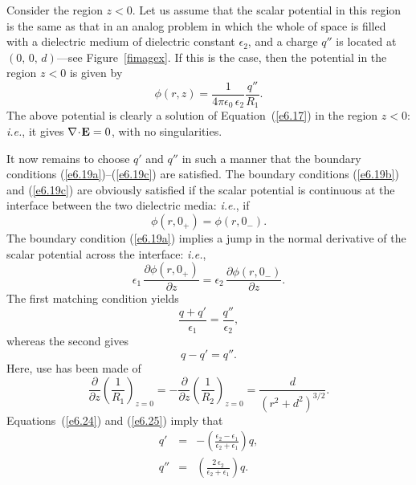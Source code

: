 Consider the region $z<0$. Let us assume that the scalar potential in this
region is the same as that in an analog problem in which the whole of space is filled
with a dielectric medium of dielectric constant $\epsilon_2$, and a charge $q''$ is located at  $(0,\,0,\,d)$---see Figure~\ref{fimagex}. If this is the case, then the potential in the region $z<0$ is
given by
\begin{equation}
\phi(r,z) = \frac{1}{4\pi\epsilon_0\,\epsilon_2} \frac{q''}{R_1}.
\end{equation}
The above potential is clearly a solution of Equation~(\ref{e6.17}) in the region
$z<0$: {\em i.e.}, it gives $\nabla\!\cdot\!{\bf E}  = 0$, with 
no singularities. 

It now remains to choose $q'$ and $q''$ in such a manner that the boundary
conditions (\ref{e6.19a})--(\ref{e6.19c}) are satisfied. The boundary conditions (\ref{e6.19b}) and
(\ref{e6.19c}) are obviously satisfied if the scalar potential is continuous
at the interface between the two dielectric media: {\em i.e.},  if
\begin{equation}
\phi(r,0_+) = \phi(r,0_-).
\end{equation}
The boundary condition (\ref{e6.19a}) implies a jump in the normal derivative
of the scalar potential across the interface: {\em i.e.}, 
\begin{equation}
\epsilon_1 \,\frac{\partial\phi(r,0_+)}{\partial z} = \epsilon_2\,
\frac{\partial \phi(r,0_-)}{\partial z}.
\end{equation}
The first matching condition yields
\begin{equation}\label{e6.24}
\frac{q+q'}{\epsilon_1} = \frac{q''}{\epsilon_2},
\end{equation}
whereas the second gives
\begin{equation}\label{e6.25}
q-q' = q''.
\end{equation}
Here, use has been made of
\begin{equation}
\frac{\partial}{\partial z}\!\left(\frac{1}{R_1}\right)_{z=0}
=- \frac{\partial}{\partial z}\!\left(\frac{1}{R_2}\right)_{z=0}
= \frac{d}{(r^2+d^2)^{3/2}}.
\end{equation}
Equations~(\ref{e6.24}) and (\ref{e6.25}) imply that
\begin{eqnarray}
q' &=& -\left(\frac{\epsilon_2-\epsilon_1}{\epsilon_2 + \epsilon_1}
\right) q,\\[0.5ex]
q''&=& \left(\frac{2\,\epsilon_2}{\epsilon_2+\epsilon_1}\right) q.
\end{eqnarray}

